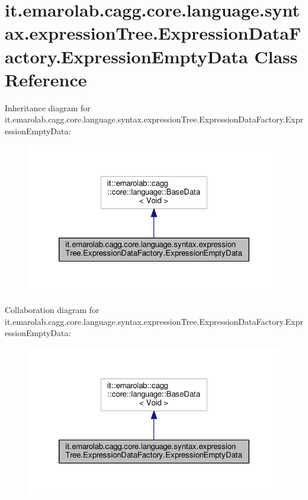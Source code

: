 \hypertarget{classit_1_1emarolab_1_1cagg_1_1core_1_1language_1_1syntax_1_1expressionTree_1_1ExpressionDataFactory_1_1ExpressionEmptyData}{\section{it.\-emarolab.\-cagg.\-core.\-language.\-syntax.\-expression\-Tree.\-Expression\-Data\-Factory.\-Expression\-Empty\-Data Class Reference}
\label{classit_1_1emarolab_1_1cagg_1_1core_1_1language_1_1syntax_1_1expressionTree_1_1ExpressionDataFactory_1_1ExpressionEmptyData}
}


Inheritance diagram for it.\-emarolab.\-cagg.\-core.\-language.\-syntax.\-expression\-Tree.\-Expression\-Data\-Factory.\-Expression\-Empty\-Data\-:\nopagebreak
\begin{figure}[H]
\begin{center}
\leavevmode
\includegraphics[width=322pt]{classit_1_1emarolab_1_1cagg_1_1core_1_1language_1_1syntax_1_1expressionTree_1_1ExpressionDataFac74ee8e943de91f16949417cd0ce32d3b}
\end{center}
\end{figure}


Collaboration diagram for it.\-emarolab.\-cagg.\-core.\-language.\-syntax.\-expression\-Tree.\-Expression\-Data\-Factory.\-Expression\-Empty\-Data\-:\nopagebreak
\begin{figure}[H]
\begin{center}
\leavevmode
\includegraphics[width=322pt]{classit_1_1emarolab_1_1cagg_1_1core_1_1language_1_1syntax_1_1expressionTree_1_1ExpressionDataFacfccc00be894b994c6aed27978e88b4e9}
\end{center}
\end{figure}
